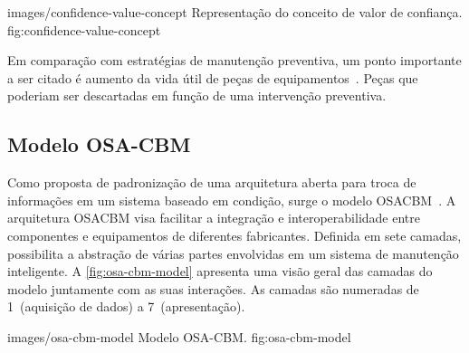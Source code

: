     {images/confidence-value-concept}
    {Representação do conceito de valor de confiança.}
    {fig:confidence-value-concept}



Em comparação com estratégias de manutenção preventiva, um ponto importante a ser citado é aumento
da vida útil de peças de equipamentos~\cite{lazzaretti2012avaliacao}. Peças que poderiam ser
descartadas em função de uma intervenção preventiva.


\subsection{Modelo OSA-CBM}

Como proposta de padronização de uma arquitetura aberta para troca de informações em um sistema
baseado em condição, surge o modelo \gls{OSACBM}~\cite{thurston2001open}. A arquitetura \gls{OSACBM}
visa facilitar a integração e interoperabilidade entre componentes e equipamentos de diferentes
fabricantes. Definida em sete camadas, possibilita a abstração de várias partes envolvidas em um
sistema de manutenção inteligente. A \cref{fig:osa-cbm-model} apresenta uma visão geral das camadas
do modelo juntamente com as suas interações. As camadas são numeradas de 1~(aquisição de dados) a
7~(apresentação).


    {images/osa-cbm-model}
    {Modelo OSA-CBM.}
    {fig:osa-cbm-model}

